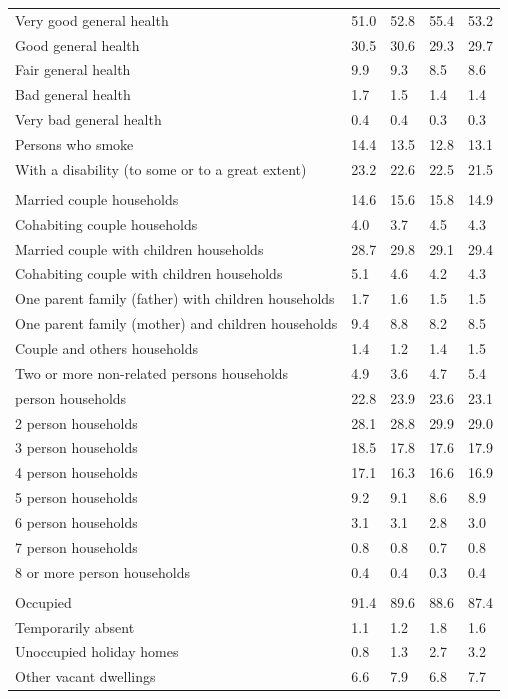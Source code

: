 \documentclass{article}
\begin{document}
\begin{table}[h]
\begin{tabular}{KTTTT}
    \hline
Very good general health & 51.0& 52.8&55.4& 53.2\\
Good general health & 30.5& 30.6& 29.3& 29.7\\
Fair general health & 9.9& 9.3&8.5& 8.6\\
Bad general health & 1.7& 1.5&1.4& 1.4\\
Very bad general health & 0.4& 0.4&0.3& 0.3\\
    \hline
Persons who smoke & 14.4& 13.5&12.8& 13.1\\
    \hline
With a disability (to some or to a great extent) & 23.2& 22.6&22.5& 21.5\\
\hline
    \\ 
    \hline
Married couple households & 14.6& 15.6& 15.8& 14.9\\
Cohabiting couple households & 4.0& 3.7& 4.5& 4.3\\
Married couple with children households & 28.7& 29.8& 29.1& 29.4\\
Cohabiting couple with children households & 5.1& 4.6& 4.2& 4.3\\
One parent family (father) with  children households & 1.7& 1.6& 1.5& 1.5\\
One parent family (mother) and children households & 9.4& 8.8& 8.2& 8.5\\
Couple and others households  & 1.4& 1.2& 1.4& 1.5\\
Two or more non-related persons households & 4.9& 3.6& 4.7& 5.4\\
     person households & 22.8& 23.9& 23.6& 23.1\\
2 person households & 28.1& 28.8& 29.9& 29.0\\
3 person households & 18.5& 17.8& 17.6& 17.9\\
4 person households & 17.1& 16.3& 16.6& 16.9\\
5 person households & 9.2& 9.1& 8.6& 8.9\\
6 person households & 3.1& 3.1& 2.8& 3.0\\
7 person households & 0.8& 0.8& 0.7& 0.8\\
8 or more person households & 0.4& 0.4& 0.3& 0.4\\
\hline
    \\ 
    \hline
Occupied & 91.4& 89.6& 88.6& 87.4\\
Temporarily absent & 1.1& 1.2& 1.8& 1.6\\
Unoccupied holiday homes & 0.8& 1.3& 2.7& 3.2\\
Other vacant dwellings & 6.6& 7.9& 6.8& 7.7\\
\hline
\end{tabular}
\end{table}
\end{document}
